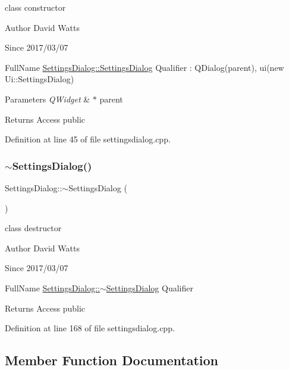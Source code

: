 class constructor

\begin{DoxyAuthor}{Author}
David Watts 
\end{DoxyAuthor}
\begin{DoxySince}{Since}
2017/03/07
\end{DoxySince}
Full\+Name \hyperlink{class_settings_dialog_a76b0a61383133b8f723431c0b663bdc1}{Settings\+Dialog\+::\+Settings\+Dialog} Qualifier \+: Q\+Dialog(parent), ui(new Ui\+::\+Settings\+Dialog) 
\begin{DoxyParams}{Parameters}
{\em Q\+Widget} & $\ast$ parent \\
\hline
\end{DoxyParams}
\begin{DoxyReturn}{Returns}
Access public 
\end{DoxyReturn}


Definition at line 45 of file settingsdialog.\+cpp.

\mbox{\label{class_settings_dialog_ac48f54d4472902be0a3845a69167f068}} 
\subsubsection{\texorpdfstring{$\sim$\+Settings\+Dialog()}{~SettingsDialog()}}
{\footnotesize\ttfamily Settings\+Dialog\+::$\sim$\+Settings\+Dialog (\begin{DoxyParamCaption}{ }\end{DoxyParamCaption})}

class destructor

\begin{DoxyAuthor}{Author}
David Watts 
\end{DoxyAuthor}
\begin{DoxySince}{Since}
2017/03/07
\end{DoxySince}
Full\+Name \hyperlink{class_settings_dialog_ac48f54d4472902be0a3845a69167f068}{Settings\+Dialog\+::$\sim$\+Settings\+Dialog} Qualifier \begin{DoxyReturn}{Returns}
Access public 
\end{DoxyReturn}


Definition at line 168 of file settingsdialog.\+cpp.



\subsection{Member Function Documentation}
\mbox{\label{class_settings_dialog_ae84085e9bcbf5411d75f7463b874e005}} 
